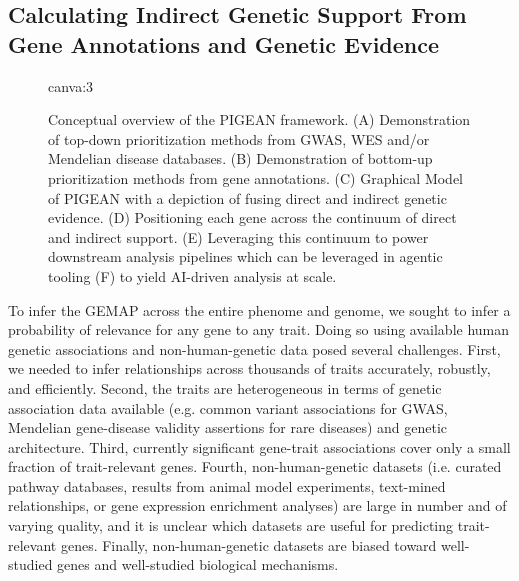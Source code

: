 \subsection{Calculating Indirect Genetic Support From Gene Annotations and Genetic Evidence}
\begin{figure}[h!]
    \centering
    {{canva:3}}
    \caption{Conceptual overview of the PIGEAN framework. (A) Demonstration of top-down prioritization methods from GWAS, WES and/or Mendelian disease databases. (B) Demonstration of bottom-up prioritization methods from gene annotations. (C) Graphical Model of PIGEAN with a depiction of fusing direct and indirect genetic evidence. (D) Positioning each gene across the continuum of direct and indirect support. (E) Leveraging this continuum to power downstream analysis pipelines which can be leveraged in agentic tooling (F) to yield AI-driven analysis at scale.}
    \label{fig:pigean-method}
\end{figure}

To infer the GEMAP across the entire phenome and genome, we sought to infer a probability of relevance for any gene to any trait. Doing so using available human genetic associations and non-human-genetic data posed several challenges. First, we needed to infer relationships across thousands of traits accurately, robustly, and efficiently. Second, the traits are heterogeneous in terms of genetic association data available (e.g. common variant associations for GWAS, Mendelian gene-disease validity assertions for rare diseases) and genetic architecture. Third, currently significant gene-trait associations cover only a small fraction of trait-relevant genes. Fourth, non-human-genetic datasets (i.e. curated pathway databases, results from animal model experiments, text-mined relationships, or gene expression enrichment analyses) are large in number and of varying quality, and it is unclear which datasets are useful for predicting trait-relevant genes. Finally, non-human-genetic datasets are biased toward well-studied genes and well-studied biological mechanisms.


